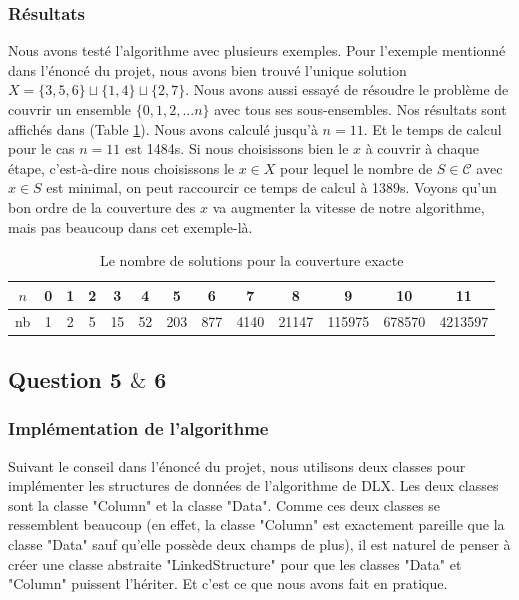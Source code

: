 \documentclass[a4paper,12pt]{article}
\begin{document}
\subsubsection{Résultats}
Nous avons testé l'algorithme avec plusieurs exemples. Pour l'exemple mentionné dans l'énoncé du projet, nous avons bien trouvé l'unique solution $X=\{3,5,6\}\sqcup\{1,4\}\sqcup\{2,7\}$. Nous avons aussi essayé de résoudre le problème de couvrir un ensemble $\{0,1,2,...n\}$ avec tous ses sous-ensembles. Nos résultats sont affichés dans (Table \ref{tab:nbsolution_exactcover}). Nous avons calculé jusqu'à $n=11$. Et le temps de calcul pour le cas $n=11$  est 1484s. Si nous choisissons bien le $x$ à couvrir à chaque étape, c'est-à-dire nous choisissons le $x\in X$ pour lequel le nombre de $S\in\mathcal{C}$ avec $x\in S$ est minimal, on peut raccourcir ce temps de calcul à 1389s. Voyons qu'un bon ordre de la couverture des $x$ va augmenter la vitesse de notre algorithme, mais pas beaucoup dans cet exemple-là. 
\begin{table}[h!]
	\caption{Le nombre de solutions pour la couverture exacte}
	\centering
	\label{tab:nbsolution_exactcover}
	\begin{tabular}{c|cccccccccccc}
		\hline
		\hline
		$n$ &0&1&2&3&4&5&6&7&8&9&10 &11 \\
		\hline
		nb & 1 &2&5&15&52&203&877&4140&21147 &115975&678570&4213597\\
		\hline
	\end{tabular}
\end{table}

\subsection{Question 5 $\&$ 6}
\subsubsection{Implémentation de l'algorithme}
Suivant le conseil dans l'énoncé du projet, nous utilisons deux classes pour implémenter les structures de données de l'algorithme de DLX. Les deux classes sont la classe "Column" et la classe "Data". Comme ces deux classes se ressemblent beaucoup (en effet, la classe "Column" est exactement pareille que la classe "Data" sauf qu'elle possède deux champs de plus), il est naturel de penser à créer une classe abstraite "LinkedStructure" pour que les classes "Data" et "Column" puissent l'hériter. Et c'est ce que nous avons fait en pratique. 
\end{document}
